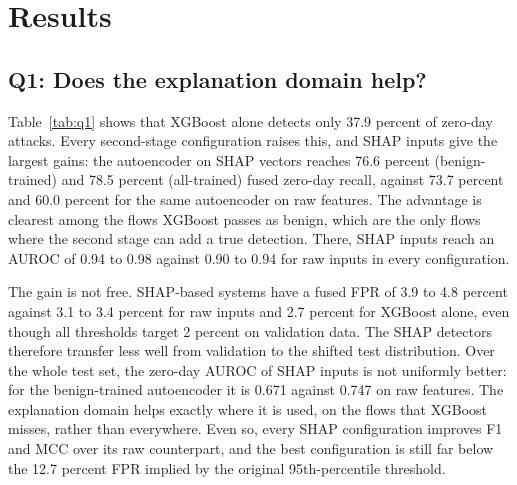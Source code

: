 \documentclass[conference]{IEEEtran}
\begin{document}
\section{Results}
\subsection{Q1: Does the explanation domain help?}
Table~\ref{tab:q1} shows that XGBoost alone detects only 37.9 percent of zero-day attacks. Every second-stage configuration raises this, and SHAP inputs give the largest gains: the autoencoder on SHAP vectors reaches 76.6 percent (benign-trained) and 78.5 percent (all-trained) fused zero-day recall, against 73.7 percent and 60.0 percent for the same autoencoder on raw features. The advantage is clearest among the flows XGBoost passes as benign, which are the only flows where the second stage can add a true detection. There, SHAP inputs reach an AUROC of 0.94 to 0.98 against 0.90 to 0.94 for raw inputs in every configuration.

The gain is not free. SHAP-based systems have a fused FPR of 3.9 to 4.8 percent against 3.1 to 3.4 percent for raw inputs and 2.7 percent for XGBoost alone, even though all thresholds target 2 percent on validation data. The SHAP detectors therefore transfer less well from validation to the shifted test distribution. Over the whole test set, the zero-day AUROC of SHAP inputs is not uniformly better: for the benign-trained autoencoder it is 0.671 against 0.747 on raw features. The explanation domain helps exactly where it is used, on the flows that XGBoost misses, rather than everywhere. Even so, every SHAP configuration improves F1 and MCC over its raw counterpart, and the best configuration is still far below the 12.7 percent FPR implied by the original 95th-percentile threshold.
\end{document}
